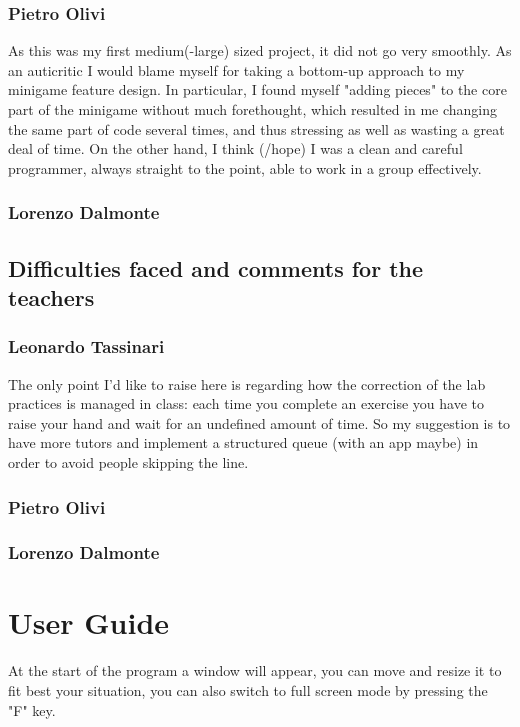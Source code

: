 \documentclass[a4paper,12pt]{report}
\begin{document}
\subsection*{Pietro Olivi}
As this was my first medium(-large) sized project, it did not go very smoothly. As an auticritic I would blame myself for taking a bottom-up approach to my minigame
feature design. In particular, I found myself "adding pieces" to the core part of the minigame without much forethought, which resulted in me changing the same part
of code several times, and thus stressing as well as wasting a great deal of time. On the other hand, I think (/hope) I was a clean and careful programmer, always
straight to the point, able to work in a group effectively.
\subsection*{Lorenzo Dalmonte}

\section{Difficulties faced and comments for the teachers}
\subsection*{Leonardo Tassinari}
The only point I'd like to raise here is regarding how the correction of the lab practices is managed in class: each time you complete an exercise you have to raise your hand and wait for an undefined amount of time.
So my suggestion is to have more tutors and implement a structured queue (with an app maybe) in order to avoid people skipping the line.
\subsection*{Pietro Olivi}
\subsection*{Lorenzo Dalmonte}


\appendix
\chapter{User Guide}
At the start of the program a window will appear, you can move and resize it to fit best your situation, you can also {\color{red}switch to full screen mode by pressing the "F" key}.
\end{document}
